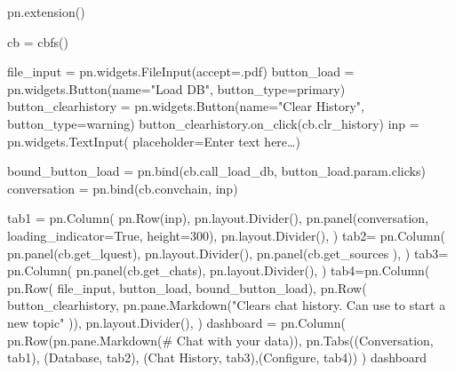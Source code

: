 \documentclass[
  letterpaper,
  DIV=11,
  numbers=noendperiod]{scrreprt}
\newenvironment{Shaded}{\begin{snugshade}}{\end{snugshade}}
\newcommand{\DecValTok}[1]{\textcolor[rgb]{0.68,0.00,0.00}{#1}}
\newcommand{\NormalTok}[1]{\textcolor[rgb]{0.00,0.23,0.31}{#1}}
\newcommand{\OperatorTok}[1]{\textcolor[rgb]{0.37,0.37,0.37}{#1}}
\newcommand{\StringTok}[1]{\textcolor[rgb]{0.13,0.47,0.30}{#1}}
\newcommand{\VariableTok}[1]{\textcolor[rgb]{0.07,0.07,0.07}{#1}}
\begin{document}
\begin{Shaded}
\begin{Highlighting}[]
\NormalTok{pn.extension()}

\NormalTok{cb }\OperatorTok{=}\NormalTok{ cbfs()}

\NormalTok{file\_input }\OperatorTok{=}\NormalTok{ pn.widgets.FileInput(accept}\OperatorTok{=}\StringTok{\textquotesingle{}.pdf\textquotesingle{}}\NormalTok{)}
\NormalTok{button\_load }\OperatorTok{=}\NormalTok{ pn.widgets.Button(name}\OperatorTok{=}\StringTok{"Load DB"}\NormalTok{, button\_type}\OperatorTok{=}\StringTok{\textquotesingle{}primary\textquotesingle{}}\NormalTok{)}
\NormalTok{button\_clearhistory }\OperatorTok{=}\NormalTok{ pn.widgets.Button(name}\OperatorTok{=}\StringTok{"Clear History"}\NormalTok{, button\_type}\OperatorTok{=}\StringTok{\textquotesingle{}warning\textquotesingle{}}\NormalTok{)}
\NormalTok{button\_clearhistory.on\_click(cb.clr\_history)}
\NormalTok{inp }\OperatorTok{=}\NormalTok{ pn.widgets.TextInput( placeholder}\OperatorTok{=}\StringTok{\textquotesingle{}Enter text here…\textquotesingle{}}\NormalTok{)}

\NormalTok{bound\_button\_load }\OperatorTok{=}\NormalTok{ pn.bind(cb.call\_load\_db, button\_load.param.clicks)}
\NormalTok{conversation }\OperatorTok{=}\NormalTok{ pn.bind(cb.convchain, inp)}

\NormalTok{tab1 }\OperatorTok{=}\NormalTok{ pn.Column(}
\NormalTok{    pn.Row(inp),}
\NormalTok{    pn.layout.Divider(),}
\NormalTok{    pn.panel(conversation,  loading\_indicator}\OperatorTok{=}\VariableTok{True}\NormalTok{, height}\OperatorTok{=}\DecValTok{300}\NormalTok{),}
\NormalTok{    pn.layout.Divider(),}
\NormalTok{)}
\NormalTok{tab2}\OperatorTok{=}\NormalTok{ pn.Column(}
\NormalTok{    pn.panel(cb.get\_lquest),}
\NormalTok{    pn.layout.Divider(),}
\NormalTok{    pn.panel(cb.get\_sources ),}
\NormalTok{)}
\NormalTok{tab3}\OperatorTok{=}\NormalTok{ pn.Column(}
\NormalTok{    pn.panel(cb.get\_chats),}
\NormalTok{    pn.layout.Divider(),}
\NormalTok{)}
\NormalTok{tab4}\OperatorTok{=}\NormalTok{pn.Column(}
\NormalTok{    pn.Row( file\_input, button\_load, bound\_button\_load),}
\NormalTok{    pn.Row( button\_clearhistory, pn.pane.Markdown(}\StringTok{"Clears chat history. Can use to start a new topic"}\NormalTok{ )),}
\NormalTok{    pn.layout.Divider(),}
\NormalTok{)}
\NormalTok{dashboard }\OperatorTok{=}\NormalTok{ pn.Column(}
\NormalTok{    pn.Row(pn.pane.Markdown(}\StringTok{\textquotesingle{}\# Chat with your data\textquotesingle{}}\NormalTok{)),}
\NormalTok{    pn.Tabs((}\StringTok{\textquotesingle{}Conversation\textquotesingle{}}\NormalTok{, tab1), (}\StringTok{\textquotesingle{}Database\textquotesingle{}}\NormalTok{, tab2), (}\StringTok{\textquotesingle{}Chat History\textquotesingle{}}\NormalTok{, tab3),(}\StringTok{\textquotesingle{}Configure\textquotesingle{}}\NormalTok{, tab4))}
\NormalTok{)}
\NormalTok{dashboard}
\end{Highlighting}
\end{Shaded}
\end{document}
